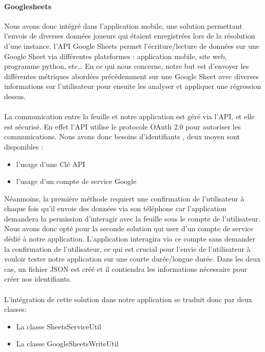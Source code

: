 \documentclass[a4paper, 11pt]{article}
\begin{document}
\paragraph{Googlesheets}
Nous avons donc intégré dans l’application mobile, une solution permettant l’envois de diverses données joueurs qui étaient enregistrées lors de la résolution d’une instance. l’API Google Sheets permet l’écriture/lecture de données sur une Google Sheet via différentes plateformes : application mobile, site web, programme python, etc… 
En ce qui nous concerne, notre but est d’envoyer les différentes métriques abordées précédemment sur une Google Sheet avec diverses informations sur l’utilisateur pour ensuite les analyser et appliquer une régression dessus.

\paragraph{}
La communication entre la feuille et notre application est géré via l’API, et elle est sécurisé. En effet l’API utilise le protocole OAuth 2.0 pour autoriser les communications. Nous avons donc besoins d’identifiants , deux moyen sont disponibles :
 \begin{itemize}
\item l’usage d’une Clé API
\item l’usage d’un compte de service Google
\end{itemize}
Néanmoins, la première méthode requiert une confirmation de l’utilisateur à chaque fois qu’il envoie des données via son téléphone car l’application demandera la permission d'interagir avec la feuille sous le compte de l’utilisateur. Nous avons donc opté pour la seconde solution qui user d’un compte de service dédié à notre application. L’application interagira via ce compte sans demander la confirmation de l’utilisateur, ce qui est crucial pour l’envie de l’utilisateur à vouloir tester notre application sur une courte durée/longue durée.
Dans les deux cas, un fichier JSON est créé et il contiendra les informations nécessaire pour créer nos identifiants.

\paragraph{}
L’intégration de cette solution dans notre application se traduit donc par deux classes:
 \begin{itemize}
\item La classe SheetsServiceUtil
\item La classe GoogleSheetsWriteUtil
\end{itemize}
\end{document}
